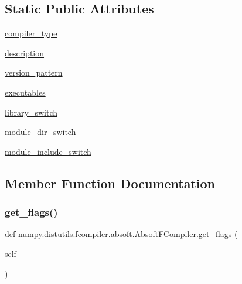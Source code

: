 \subsection*{Static Public Attributes}
\begin{DoxyCompactItemize}
\item 
\hyperlink{classnumpy_1_1distutils_1_1fcompiler_1_1absoft_1_1AbsoftFCompiler_a2b804e693be147632360d9bc3656dfa1}{compiler\+\_\+type}
\item 
\hyperlink{classnumpy_1_1distutils_1_1fcompiler_1_1absoft_1_1AbsoftFCompiler_a9d3b409137c636c55d67c64bcc3bb31a}{description}
\item 
\hyperlink{classnumpy_1_1distutils_1_1fcompiler_1_1absoft_1_1AbsoftFCompiler_aeed1bcf7675b07e888128a98547f688a}{version\+\_\+pattern}
\item 
\hyperlink{classnumpy_1_1distutils_1_1fcompiler_1_1absoft_1_1AbsoftFCompiler_a4b4e0dc7d12473a7a86ee0024cadb01a}{executables}
\item 
\hyperlink{classnumpy_1_1distutils_1_1fcompiler_1_1absoft_1_1AbsoftFCompiler_a8d25039055de07cad73fcaac5de3842d}{library\+\_\+switch}
\item 
\hyperlink{classnumpy_1_1distutils_1_1fcompiler_1_1absoft_1_1AbsoftFCompiler_a486eec2db9eb8932ba46fe11d55db12f}{module\+\_\+dir\+\_\+switch}
\item 
\hyperlink{classnumpy_1_1distutils_1_1fcompiler_1_1absoft_1_1AbsoftFCompiler_aadc1d7b2a26588eb74e1da53b26baed5}{module\+\_\+include\+\_\+switch}
\end{DoxyCompactItemize}


\subsection{Member Function Documentation}
\mbox{\label{classnumpy_1_1distutils_1_1fcompiler_1_1absoft_1_1AbsoftFCompiler_a57ed84ab79e2fa2cc0a105b36f3947e8}} 
\subsubsection{\texorpdfstring{get\+\_\+flags()}{get\_flags()}}
{\footnotesize\ttfamily def numpy.\+distutils.\+fcompiler.\+absoft.\+Absoft\+F\+Compiler.\+get\+\_\+flags (\begin{DoxyParamCaption}\item[{}]{self }\end{DoxyParamCaption})}

